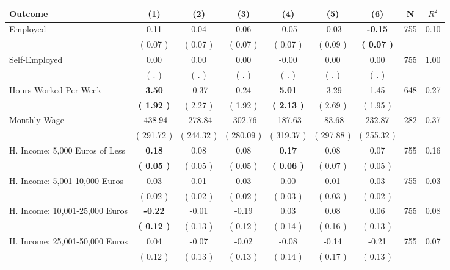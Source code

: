 \begin{tabular}{lcccccccc}
\toprule
 \textbf{Outcome} & \textbf{(1)} & \textbf{(2)} & \textbf{(3)} & \textbf{(4)} & \textbf{(5)} & \textbf{(6)} & \textbf{N} & \textbf{$ R^2$} \\
\midrule
Employed &      0.11 &      0.04 &      0.06 &     -0.05 &     -0.03 & \textbf{    -0.15} & 755 &       0.10 \\ 
 & (     0.07 ) & (     0.07 ) & (     0.07 ) & (     0.07 ) & (     0.09 ) & \textbf{(     0.07 )} & \\
Self-Employed &      0.00 &      0.00 &      0.00 &     -0.00 &      0.00 &      0.00 & 755 &       1.00 \\ 
 & (        . ) & (        . ) & (        . ) & (        . ) & (        . ) & (        . ) & \\
Hours Worked Per Week & \textbf{     3.50} &     -0.37 &      0.24 & \textbf{     5.01} &     -3.29 &      1.45 & 648 &       0.27 \\ 
 & \textbf{(     1.92 )} & (     2.27 ) & (     1.92 ) & \textbf{(     2.13 )} & (     2.69 ) & (     1.95 ) & \\
Monthly Wage &   -438.94 &   -278.84 &   -302.76 &   -187.63 &    -83.68 &    232.87 & 282 &       0.37 \\ 
 & (   291.72 ) & (   244.32 ) & (   280.09 ) & (   319.37 ) & (   297.88 ) & (   255.32 ) & \\
H. Income: 5,000 Euros of Less & \textbf{     0.18} &      0.08 &      0.08 & \textbf{     0.17} &      0.08 &      0.07 & 755 &       0.16 \\ 
 & \textbf{(     0.05 )} & (     0.05 ) & (     0.05 ) & \textbf{(     0.06 )} & (     0.07 ) & (     0.05 ) & \\
H. Income: 5,001-10,000 Euros &      0.03 &      0.01 &      0.03 &      0.00 &      0.01 &      0.03 & 755 &       0.03 \\ 
 & (     0.02 ) & (     0.02 ) & (     0.02 ) & (     0.03 ) & (     0.03 ) & (     0.02 ) & \\
H. Income: 10,001-25,000 Euros & \textbf{    -0.22} &     -0.01 &     -0.19 &      0.03 &      0.08 &      0.06 & 755 &       0.08 \\ 
 & \textbf{(     0.12 )} & (     0.13 ) & (     0.12 ) & (     0.14 ) & (     0.16 ) & (     0.13 ) & \\
H. Income: 25,001-50,000 Euros &      0.04 &     -0.07 &     -0.02 &     -0.08 &     -0.14 &     -0.21 & 755 &       0.07 \\ 
 & (     0.12 ) & (     0.13 ) & (     0.13 ) & (     0.14 ) & (     0.17 ) & (     0.13 ) & \\

\end{tabular}
